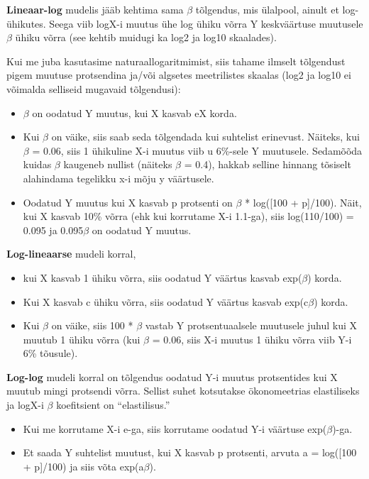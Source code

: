 \documentclass[]{book}
\begin{document}
\textbf{Lineaar-log} mudelis jääb kehtima sama \(\beta\) tõlgendus, mis
ülalpool, ainult et log-ühikutes. Seega viib logX-i muutus ühe log ühiku
võrra Y keskväärtuse muutusele \(\beta\) ühiku võrra (see kehtib muidugi
ka log2 ja log10 skaalades).

Kui me juba kasutasime naturaallogaritmimist, siis tahame ilmselt
tõlgendust pigem muutuse protsendina ja/või algsetes meetrilistes
skaalas (log2 ja log10 ei võimalda selliseid mugavaid tõlgendusi):

\begin{itemize}
\item
  \(\beta\) on oodatud Y muutus, kui X kasvab eX korda.
\item
  Kui \(\beta\) on väike, siis saab seda tõlgendada kui suhtelist
  erinevust. Näiteks, kui \(\beta\) = 0.06, siis 1 ühikuline X-i muutus
  viib u 6\%-sele Y muutusele. Sedamõõda kuidas \(\beta\) kaugeneb
  nullist (näiteks \(\beta\) = 0.4), hakkab selline hinnang tõsiselt
  alahindama tegelikku x-i mõju y väärtusele.
\item
  Oodatud Y muutus kui X kasvab p protsenti on \(\beta\) * log({[}100 +
  p{]}/100). Näit, kui X kasvab 10\% võrra (ehk kui korrutame X-i
  1.1-ga), siis log(110/100) = 0.095 ja 0.095\(\beta\) on oodatud Y
  muutus.
\end{itemize}

\textbf{Log-lineaarse} mudeli korral,

\begin{itemize}
\item
  kui X kasvab 1 ühiku võrra, siis oodatud Y väärtus kasvab
  exp(\(\beta\)) korda.
\item
  Kui X kasvab c ühiku võrra, siis oodatud Y väärtus kasvab
  exp(c\(\beta\)) korda.
\item
  Kui \(\beta\) on väike, siis 100 * \(\beta\) vastab Y protsentuaalsele
  muutusele juhul kui X muutub 1 ühiku võrra (kui \(\beta\) = 0.06, siis
  X-i muutus 1 ühiku võrra viib Y-i 6\% tõusule).
\end{itemize}

\textbf{Log-log} mudeli korral on tõlgendus oodatud Y-i muutus
protsentides kui X muutub mingi protsendi võrra. Sellist suhet
kotsutakse ökonomeetrias elastiliseks ja logX-i \(\beta\) koefitsient on
``elastilisus.''

\begin{itemize}
\item
  Kui me korrutame X-i e-ga, siis korrutame oodatud Y-i väärtuse
  exp(\(\beta\))-ga.
\item
  Et saada Y suhtelist muutust, kui X kasvab p protsenti, arvuta a =
  log({[}100 + p{]}/100) ja siis võta exp(a\(\beta\)).
\end{itemize}
\end{document}

